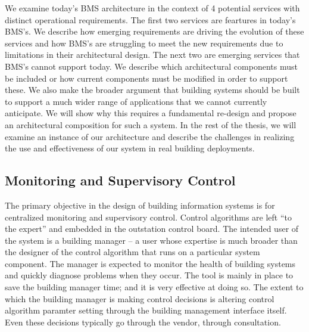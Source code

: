 We examine today's BMS architecture in the context of 4 potential services with distinct operational requirements. %
The first two services are feartures in today's BMS's.  
We describe how emerging requirements are driving the evolution of these
services and how BMS's are struggling to meet the new requirements due to limitations in their architectural design.
The next two are emerging services that BMS's cannot support today.  We describe which architectural components must be included
or how current components must be modified in order to support these.  We also make the broader argument that 
building systems should be built to support a much wider range of applications that we cannot currently anticipate.
We will show why this requires a fundamental re-design and propose an architectural composition for such a system.
In the rest of the thesis, we will examine an instance of our architecture and describe the challenges in realizing
the use and effectiveness of our system in real building deployments.


\subsection{Monitoring and Supervisory Control}
The primary objective in the design of building information systems is for centralized monitoring and supervisory
control.  Control algorithms are left ``to the expert'' and embedded in the outstation control board.  The intended
user of the system is a building manager -- a user whose expertise is much broader than the designer of the control
algorithm that runs on a particular system component.
The manager is expected to monitor the health of building systems and quickly diagnose problems when they occur.  The tool
is mainly in place to save the building manager time; and it is very effective at doing so.  The extent to which 
the building manager is making control decisions is altering control algorithm paramter setting through
the building management interface itself.  Even these decisions typically go through the vendor, through consultation.

